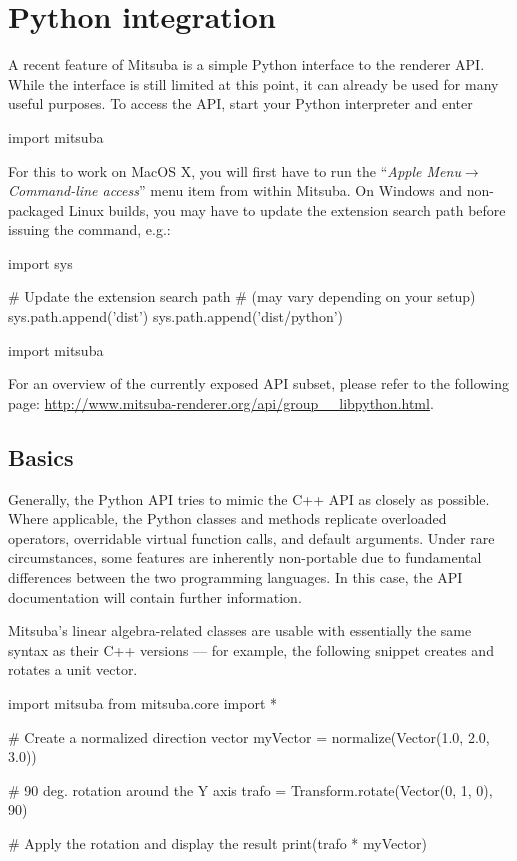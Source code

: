 \section{Python integration}
\label{sec:python}
A recent feature of Mitsuba is a simple Python interface to the renderer API. 
While the interface is still limited at this point, it can already be
used for many useful purposes. To access the API, start your Python 
interpreter and enter
\begin{python}
import mitsuba
\end{python}
For this to work on MacOS X, you will first have to run the ``\emph{Apple
Menu}$\to$\emph{Command-line access}'' menu item from within Mitsuba.
On Windows and non-packaged Linux builds, you may have to update the extension
search path before issuing the  command, e.g.:
\begin{python}
import sys

# Update the extension search path
# (may vary depending on your setup)
sys.path.append('dist')
sys.path.append('dist/python')

import mitsuba
\end{python}
For an overview of the currently exposed API subset, please refer
to the following page: \url{http://www.mitsuba-renderer.org/api/group__libpython.html}.

\subsection{Basics}
Generally, the Python API tries to mimic the C++ API as closely as possible.
Where applicable, the Python classes and methods replicate overloaded operators,
overridable virtual function calls, and default arguments. Under rare circumstances, 
some features are inherently non-portable due to fundamental differences between the 
two programming languages. In this case, the API documentation will contain further
information.

Mitsuba's linear algebra-related classes are usable with essentially the
same syntax as their C++ versions --- for example, the following snippet 
creates and rotates a unit vector.
\begin{python}
import mitsuba
from mitsuba.core import *

# Create a normalized direction vector
myVector = normalize(Vector(1.0, 2.0, 3.0))

# 90 deg. rotation around the Y axis
trafo = Transform.rotate(Vector(0, 1, 0), 90)

# Apply the rotation and display the result
print(trafo * myVector)
\end{python}

